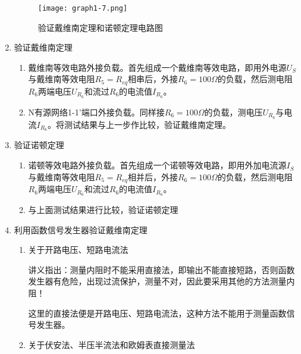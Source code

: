 \documentclass[dvipsnames, svgnames,a4paper,11pt]{article}
\begin{document}
\begin{enumerate}
\begin{enumerate}
						

		\end{enumerate}

		\begin{figure}[htbp]
			\centering
			\texttt{[image: graph1-7.png]}
			\caption{验证戴维南定理和诺顿定理电路图}
			\label{fig:graph1-7}
		\end{figure}

		\item 验证戴维南定理
			\begin{enumerate}
				\item 戴维南等效电路外接负载。首先组成一个戴维南等效电路，即用外电源$U_S$与戴维南等效电阻$R_5=R_{eq}$相串后，外接$R_6=100\Omega$的负载，然后测电阻$R_6$两端电压$U_{R_6}$和流过$R_6$的电流值$I_{R_6}$。
				
				\item N有源网络1-1’端口外接负载。同样接$R_6=100\Omega$的负载，测电压$U_{R_6}$与电流$I_{R_6}$。将测试结果与上一步作比较，验证戴维南定理。
			\end{enumerate}


		\item 验证诺顿定理
			\begin{enumerate}
				\item 诺顿等效电路外接负载。首先组成一个诺顿等效电路，即用外加电流源$I_S$与戴维南等效电阻$R_5=R_{eq}$相并后，外接$R_6=100\Omega$的负载，然后测电阻$R_6$两端电压$U_{R_6}$和流过$R_6$的电流值$I_{R_6}$。
				\item 与上面测试结果进行比较，验证诺顿定理
			\end{enumerate}


		\item 利用函数信号发生器验证戴维南定理
			\begin{enumerate}
				\item 关于开路电压、短路电流法
				
				讲义指出：测量内阻时不能采用直接法，即输出不能直接短路，否则函数发生器有危险，出现过流保护，测量不对，因此要采用其他的方法测量内阻！
				
				这里的直接法便是开路电压、短路电流法，这种方法不能用于测量函数信号发生器。
				
				\item 关于伏安法、半压半流法和欧姆表直接测量法
				

\end{enumerate}
\end{enumerate}
\end{document}
